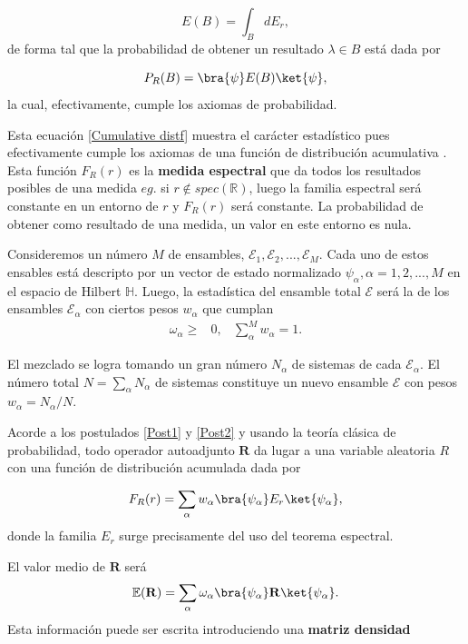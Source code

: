  \begin{equation}
     E (B) = \int_{B} dE_r,
 \end{equation}
 de forma tal que la probabilidad de obtener un resultado $\lambda \in B$ está dada por
 
 \begin{equation}
     P_R (B) = \bra{\psi}E(B)\ket{\psi},
 \end{equation}
 la cual, efectivamente, cumple los axiomas de probabilidad. 
 
  Esta ecuación \eqref{Cumulative distf} muestra el carácter estadístico pues efectivamente cumple los axiomas de una función de distribución acumulativa \cite[p.~7]{HeinzPetruccione}. Esta función $F_R (r)$ es la \textbf{medida espectral} que da todos los resultados posibles de una medida $eg.$ si $r \notin spec(\mathbb{R})$, luego la familia espectral será constante en un entorno de $r$ y $F_R (r)$ será constante. La probabilidad de obtener como resultado de una medida, un valor en este entorno es nula.
 
 Consideremos un número $M$ de ensambles, $\mathcal{E}_1, \mathcal{E}_2, ..., \mathcal{E}_M$. Cada uno de estos ensables está descripto por un vector de estado normalizado $\psi_{\alpha}, \alpha = 1,2,...,M$ en el espacio de Hilbert $\mathbb{H}$. Luego, la estadística del ensamble total $\mathcal{E}$ será la de los ensambles $\mathcal{E}_{\alpha}$ con ciertos pesos $w_{\alpha}$ que cumplan 
 \begin{align*}
 \omega_{\alpha} \geq & 0, &  \sum_{\alpha}^{M} w_{\alpha} = 1.    
 \end{align*}
 
 El mezclado se logra tomando un gran número $N_\alpha$ de sistemas de cada $\mathcal{E}_{\alpha}$. El número total $N  = \sum_{\alpha} N_{\alpha}$ de sistemas constituye un nuevo ensamble $\mathcal{E}$ con pesos $w_{\alpha} = N_{\alpha} / N$.
 
 Acorde a los postulados \ref{Post1} y \ref{Post2} y usando la teoría clásica de probabilidad, todo operador autoadjunto $\mathbf{R}$ da lugar a una variable aleatoria $R$ con una función de distribución acumulada dada por 
 
 \begin{equation}
     F_R (r) = \sum_{\alpha} w_{\alpha} \bra{\psi_\alpha}E_r \ket{\psi_{\alpha}},
 \end{equation}
  donde la familia $E_r$ surge precisamente del uso del teorema espectral. 
 
 El valor medio de $\mathbf{R}$ será 
 \begin{equation}
      \mathbb{E}(\mathbf{R}) = \sum_{\alpha} \omega_{\alpha} \bra{\psi_{\alpha}}\mathbf{R}\ket{\psi_{\alpha}}.
 \end{equation}
  Esta información puede ser escrita introduciendo una \textbf{matriz densidad} 
  
